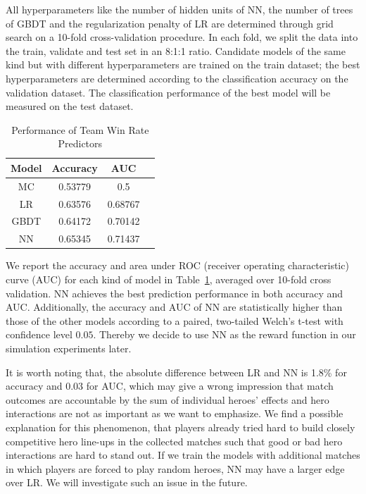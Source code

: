 All hyperparameters like the number of hidden units of NN, the number of trees of GBDT and the regularization penalty of LR are determined through grid search on a 10-fold cross-validation procedure. In each fold, we split the data into the train, validate and test set in an 8:1:1 ratio. Candidate models of the same kind but with different hyperparameters are trained on the train dataset; the best hyperparameters are determined according to the classification accuracy on the validation dataset. The classification performance of the best model will be measured on the test dataset.  

\begin{table}
  \caption{Performance of Team Win Rate Predictors}
  \centering
  \label{tab:auc}
  \begin{tabular}{c@{\hskip 0.5in}c@{\hskip 0.36in}c@{\hskip 0.36in}c}
    \toprule
    Model  & Accuracy & AUC  \\
    \midrule
    MC   & 0.53779        & 0.5       \\
    LR   & 0.63576        & 0.68767    \\
    GBDT & 0.64172        & 0.70142   \\
	NN   & 0.65345        & 0.71437  \\
  \bottomrule
\end{tabular}
\end{table}


We report the accuracy and area under ROC (receiver operating characteristic) curve (AUC) for each kind of model in Table~\ref{tab:auc}, averaged over 10-fold cross validation. NN achieves the best prediction performance in both accuracy and AUC. Additionally, the accuracy and AUC of NN are statistically higher than those of the other models according to a paired, two-tailed Welch's t-test with confidence level $0.05$. Thereby we decide to use NN as the reward function in our simulation experiments later. 

It is worth noting that, the absolute difference between LR and NN is 1.8\% for accuracy and 0.03 for AUC, which may give a wrong impression that match outcomes are accountable by the sum of individual heroes' effects and hero interactions are not as important as we want to emphasize. We find a possible explanation for this phenomenon, that players already tried hard to build closely competitive hero line-ups in the collected matches such that good or bad hero interactions are hard to stand out. If we train the models with additional matches in which players are forced to play random heroes, NN may have a larger edge over LR. We will investigate such an issue in the future.




